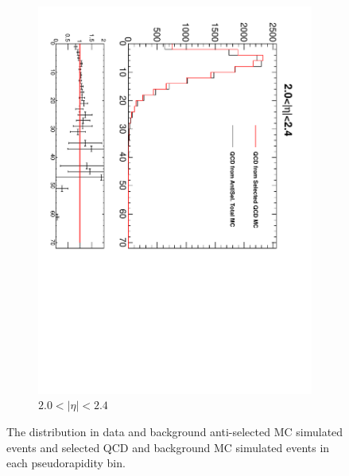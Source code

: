 \begin{figure}[htbp]
\begin{subfigure}{0.4\textwidth}
    \includegraphics*[trim = 0mm 0mm 15mm 0mm, clip, width=\textwidth, angle=90]{MetCompare_anti_eta6.pdf}
    \caption{$2.0<| \eta |<2.4$}
    \label{fig:qcd_met_eta6}
  \end{subfigure}
  \caption[The \ETm distribution in anti-selected {MC}
simulated events and selected {QCD} and \gjet background MC simulated events.]
{The \ETm distribution in data and background anti-selected {MC} simulated
events and selected {QCD} and \gjet background MC simulated events in each
pseudorapidity bin\cite{baisini2010electron}.}
  \label{tab:antiselclosure}
\end{figure}

